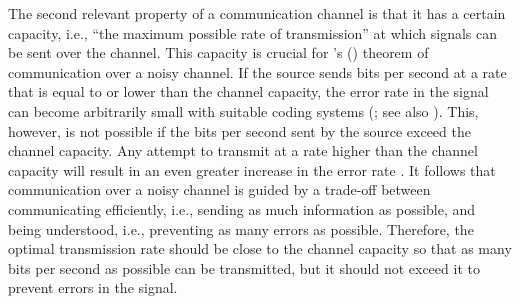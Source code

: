 The second relevant property of a communication channel is that it has a certain capacity,  i.e., ``the maximum possible rate of transmission'' \citep[410]{shannon1948} at which signals can be sent over the channel.
This capacity is crucial for \citeauthor{shannon1948}'s (\citeyear{shannon1948}) theorem of communication over a noisy channel.  
If the source sends bits per second at a rate that is equal to or lower than the channel capacity,  the error rate in the signal can become arbitrarily small with suitable coding systems (\cite[411]{shannon1948}; see also \cite[21]{weaver1949}).
This, however, is not possible if the bits per second sent by the source exceed the channel capacity.
Any attempt to transmit at a rate higher than the channel capacity  will result in an even greater increase in the error rate \citep[410]{shannon1948}.
It follows that communication over a noisy channel is guided by a trade-off between communicating efficiently, i.e., sending as much information  as possible, and being understood, i.e., preventing as many errors as possible.
Therefore, the optimal transmission rate should be close to the channel capacity  so that as many bits per second as possible can be transmitted, but it should not exceed it to prevent errors in the signal. 

